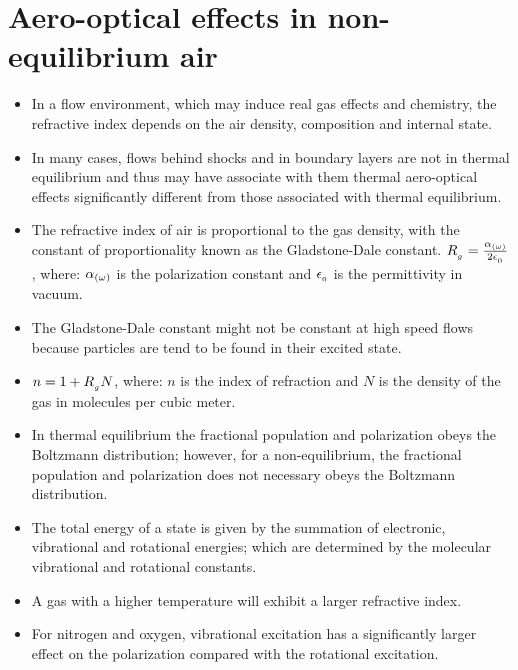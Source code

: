     \section{Aero-optical effects in non-equilibrium air \cite{doi:10.2514/6.2018-3904}}
        \begin{itemize}
            \item In a flow environment, which may induce real gas effects and chemistry, the refractive index depends on the air density, composition and internal state. 
            \item In many cases, flows behind shocks and in boundary layers are not in thermal equilibrium and thus may have associate with them thermal aero-optical effects significantly different from those associated with thermal equilibrium. 
            \item The refractive index of air is proportional to the gas density, with the constant of proportionality known as the Gladstone-Dale constant. $R_{_{g}} = \frac{\alpha_{\left(\omega\right)}}{2\epsilon_{_{0}}}$, where: $\alpha_{\left(\omega\right)}$ is the polarization constant and $\epsilon_{_{0}}$ is the permittivity in vacuum. 
            \item The Gladstone-Dale constant might not be constant at high speed flows because particles are tend to be found in their excited state. 
            \item $n = 1 + R_{_{g}}N$, where: $n$ is the index of refraction and $N$ is the density of the gas in molecules per cubic meter.  
            \item In thermal equilibrium the fractional population and polarization obeys the Boltzmann distribution; however, for a non-equilibrium, the fractional population and polarization does not necessary obeys the Boltzmann distribution.  
            \item The total energy of a state is given by the summation of electronic, vibrational and rotational energies; which are determined by the molecular vibrational and rotational constants.
            \item A gas with a higher temperature will exhibit a larger refractive index. 
            \item For nitrogen and oxygen, vibrational excitation has a significantly larger effect on the polarization compared with the rotational excitation. 
        \end{itemize}


